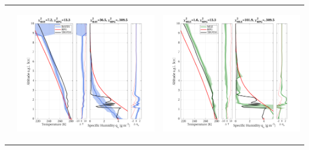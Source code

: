 \documentclass[landscape,paperwidth=1189mm,paperheight=841mm,fontscale=0.4,margin=.7cm]{baposter}
\begin{document}
\begin{poster}
{\begin{tabular}{lcc}
\begin{minipage}{0.18\linewidth}
	\end{minipage}
 	&
	\begin{minipage}{0.35\linewidth}
		\begin{center}             
			\includegraphics[width=1.25\linewidth,height=0.19\textheight]{Profile_200_BAY.png}
	\end{center}
\end{minipage}
&
\begin{minipage}{0.35\linewidth}
	\begin{center}             
		\includegraphics[width=1.25\linewidth,height=0.19\textheight]{Profile_200_MLE.png}

\end{center}
\end{minipage}
\end{tabular}}
\end{poster}
\end{document}
